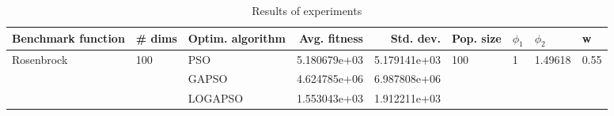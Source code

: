 \begin{table}
\centering
\caption{Results of experiments}
\begin{tabular}{lllrrllll}
\toprule
         Benchmark function &              \# dims & Optim. algorithm &  Avg. fitness &    Std. dev. &            Pop. size &         $\phi_{1}$ &               $\phi_{2}$ &                     w \\
\midrule
\multirow{3}{*}{Rosenbrock} & \multirow{3}{*}{100} &              PSO &  5.180679e+03 & 5.179141e+03 & \multirow{3}{*}{100} & \multirow{3}{*}{1} & \multirow{3}{*}{1.49618} & \multirow{3}{*}{0.55} \\
                            &                      &            GAPSO &  4.624785e+06 & 6.987808e+06 &                      &                    &                          &                       \\
                            &                      &          LOGAPSO &  1.553043e+03 & 1.912211e+03 &                      &                    &                          &                       \\
\bottomrule
\end{tabular}
\end{table}

